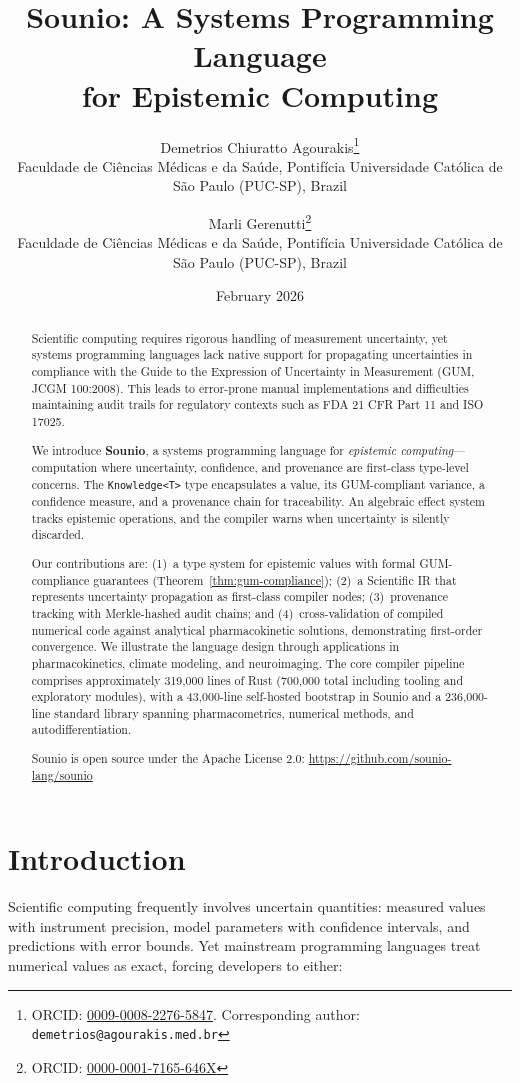 \documentclass[11pt,a4paper]{article}
\title{Sounio: A Systems Programming Language\\for Epistemic Computing}
\author{
  Demetrios Chiuratto Agourakis\thanks{ORCID: \href{https://orcid.org/0009-0008-2276-5847}{0009-0008-2276-5847}.
  Corresponding author: \texttt{demetrios@agourakis.med.br}}\\
  Faculdade de Ci\^{e}ncias M\'{e}dicas e da Sa\'{u}de,
  Pontif\'{i}cia Universidade Cat\'{o}lica de S\~{a}o Paulo (PUC-SP), Brazil\\[0.5em]
  \and
  Marli Gerenutti\thanks{ORCID: \href{https://orcid.org/0000-0001-7165-646X}{0000-0001-7165-646X}}\\
  Faculdade de Ci\^{e}ncias M\'{e}dicas e da Sa\'{u}de,
  Pontif\'{i}cia Universidade Cat\'{o}lica de S\~{a}o Paulo (PUC-SP), Brazil
}
\date{February 2026}
\begin{document}
\maketitle

\begin{abstract}
Scientific computing requires rigorous handling of measurement uncertainty,
yet systems programming languages lack native support for propagating
uncertainties in compliance with the Guide to the Expression of Uncertainty
in Measurement (GUM, JCGM 100:2008). This leads to error-prone manual
implementations and difficulties maintaining audit trails for regulatory
contexts such as FDA 21 CFR Part 11 and ISO 17025.

We introduce \textbf{Sounio}, a systems programming language for
\emph{epistemic computing}---computation where uncertainty, confidence, and
provenance are first-class type-level concerns. The \texttt{Knowledge<T>}
type encapsulates a value, its GUM-compliant variance, a confidence measure,
and a provenance chain for traceability. An algebraic effect system tracks
epistemic operations, and the compiler warns when uncertainty is silently
discarded.

Our contributions are: (1)~a type system for epistemic values with formal
GUM-compliance guarantees (Theorem~\ref{thm:gum-compliance});
(2)~a Scientific IR that represents uncertainty propagation as first-class
compiler nodes; (3)~provenance tracking with Merkle-hashed audit chains;
and (4)~cross-validation of compiled numerical code against analytical
pharmacokinetic solutions, demonstrating first-order convergence.
We illustrate the language design through applications in pharmacokinetics,
climate modeling, and neuroimaging. The core compiler pipeline comprises
approximately 319,000 lines of Rust (700,000 total including tooling
and exploratory modules), with a 43,000-line self-hosted bootstrap in
Sounio and a 236,000-line standard library spanning pharmacometrics,
numerical methods, and autodifferentiation.

Sounio is open source under the Apache License 2.0:
\url{https://github.com/sounio-lang/sounio}
\end{abstract}

\section{Introduction}
\label{sec:intro}

Scientific computing frequently involves uncertain quantities: measured values
with instrument precision, model parameters with confidence intervals, and
predictions with error bounds. Yet mainstream programming languages treat
numerical values as exact, forcing developers to either:
\end{document}
